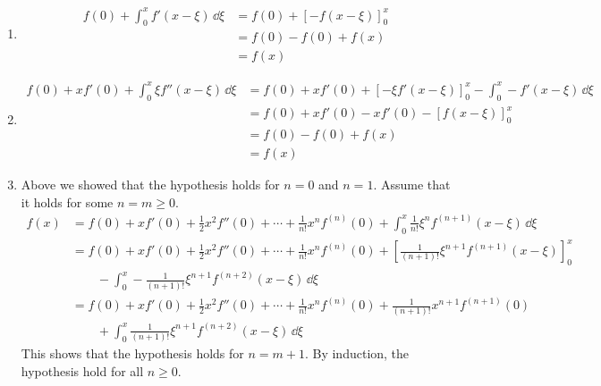 \begin{Solution}
  \label{solution taylor series integral}
  \begin{enumerate}
  \item
    \begin{align*}
      f(0) + \int_0^x f'(x-\xi)\,\dd \xi
      &= f(0) + \left[ - f(x-\xi) \right]_0^x \\
      &= f(0) - f(0) + f(x) \\
      &= f(x)
    \end{align*}
  \item
    \begin{align*}
      f(0) + x f'(0) + \int_0^x \xi f''(x-\xi)\,\dd \xi
      &= f(0) + x f'(0) + \left[ -\xi f'(x-\xi) \right]_0^x
      - \int_0^x -f'(x-\xi) \,\dd \xi \\
      &= f(0) + x f'(0) -x f'(0)
      - \left[ f(x-\xi) \right]_0^x \\
      &= f(0) - f(0) + f(x) \\
      &= f(x)
    \end{align*}
  \item
    Above we showed that the hypothesis holds for $n=0$ and $n=1$.  Assume
    that it holds for some $n = m \geq 0$.
    \begin{align*}
      f(x)
      &= f(0) + x f'(0) + \frac{1}{2} x^2 f''(0) + \cdots +
      \frac{1}{n!} x^n f^{(n)}(0)
      + \int_0^x \frac{1}{n!} \xi^n  f^{(n+1)}(x-\xi)\,\dd \xi \\
      &= f(0) + x f'(0) + \frac{1}{2} x^2 f''(0) + \cdots +
      \frac{1}{n!} x^n f^{(n)}(0)
      + \left[ \frac{1}{(n+1)!} \xi^{n+1}
        f^{(n+1)}(x-\xi)\right]_0^x \\
      &\qquad - \int_0^x -\frac{1}{(n+1)!} \xi^{n+1}
      f^{(n+2)}(x-\xi)\,\dd \xi \\
      &= f(0) + x f'(0) + \frac{1}{2} x^2 f''(0) + \cdots +
      \frac{1}{n!} x^n f^{(n)}(0)
      + \frac{1}{(n+1)!} x^{n+1} f^{(n+1)}(0) \\
      &\qquad + \int_0^x \frac{1}{(n+1)!} \xi^{n+1}  f^{(n+2)}(x-\xi)\,\dd \xi
    \end{align*}
    This shows that the hypothesis holds for $n=m+1$.  By induction, the
    hypothesis hold for all $n \geq 0$.
  \end{enumerate}
\end{Solution}










